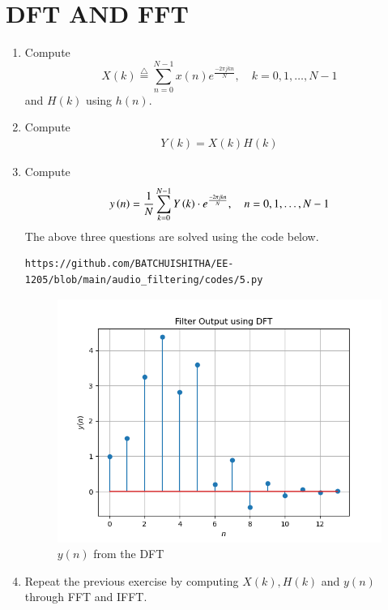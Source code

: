\documentclass[journal,12pt,twocolumn]{IEEEtran}
\newcommand{\define}{\stackrel{\triangle}{=}}
\theoremstyle{remark}
\begin{document}
\section{DFT AND FFT}
\begin{enumerate}[label=\thesection.\arabic*]
\item Compute
\begin{equation}
X(k) \define \sum _{n=0}^{N-1}x(n) e^{\frac{-2\pi jkn}{N}}, \quad k = 0,1,\dots, N-1
\end{equation}
and $H(k)$ using $h(n)$.
\item Compute 
\begin{align}
Y(k) = X(k)H(k) \label{eq:5.2.1}
\end{align}
\item Compute
\begin{align}
y\left(n\right)={\frac {1}{N}}\sum _{k=0}^{N-1}Y\left(k\right)\cdot e^{\frac{-2\pi jkn}{N}} ,\quad n = 0,1,\dots, N-1\label{eq:5.3.1}
\end{align}
\solution The above three questions are solved using the code below.
\begin{lstlisting}
https://github.com/BATCHUISHITHA/EE-1205/blob/main/audio_filtering/codes/5.py
\end{lstlisting}
\begin{figure}[ht]
	\centering
	\includegraphics[width=\columnwidth]{figs/5.png}
	\caption{$y(n)$ from the DFT}
	\label{fig:5}
\end{figure}
\item Repeat the previous exercise by computing $X(k), H(k)$ and $y(n)$ through FFT and IFFT.\\

\end{enumerate}
\end{document}
